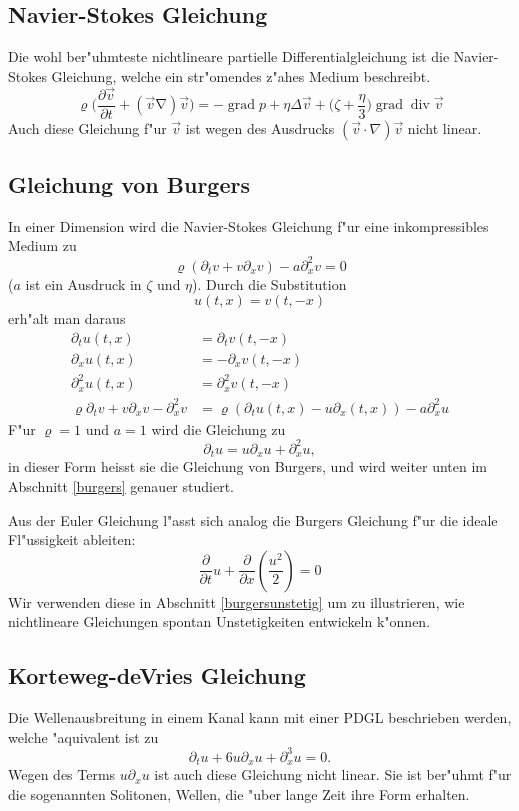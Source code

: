 \subsection{Navier-Stokes Gleichung}
Die wohl ber"uhmteste nichtlineare partielle Differentialgleichung ist
die Navier-Stokes Gleichung, welche ein str"omendes z"ahes Medium beschreibt.
$$\varrho\biggl(
\frac{\partial \vec v}{\partial t}+(\vec v\operatorname \nabla)\vec v
\biggr)
=
-\operatorname{grad}p
+\eta\Delta \vec v+\biggl(\zeta+\frac{\eta}3\biggr)\operatorname{grad}\operatorname{div}\vec v
$$
Auch diese Gleichung f"ur $\vec v$ ist wegen des Ausdrucks $(\vec v\cdot\nabla)\vec v$
nicht linear.

\subsection{Gleichung von Burgers}
In einer Dimension  wird die Navier-Stokes Gleichung f"ur eine inkompressibles
Medium zu
$$\varrho(\partial_t v+v\partial_x v)-a\partial_x^2v=0$$
($a$ ist ein Ausdruck in $\zeta$ und $\eta$).
Durch die Substitution
$$u(t,x)=v(t,-x)$$
erh"alt man daraus 
\begin{align*}
\partial_tu(t,x)&=\partial_tv(t,-x)\\
\partial_xu(t,x)&=-\partial_xv(t,-x)\\
\partial_x^2u(t,x)&=\partial_x^2v(t,-x)\\
\varrho
\partial_t v+v\partial_x v-\partial_x^2v
&=
\varrho(\partial_tu(t,x)-u\partial_x(t,x))-a\partial_x^2u
\end{align*}
F"ur $\varrho=1$ und $a=1$ wird die Gleichung zu
$$\partial_tu=u\partial_xu+\partial_x^2u,$$
in dieser Form heisst sie die Gleichung von Burgers,
und wird weiter unten im Abschnitt
\ref{burgers} genauer studiert.

Aus der Euler Gleichung l"asst sich analog die Burgers Gleichung
f"ur die ideale Fl"ussigkeit ableiten:
$$
\frac{\partial}{\partial t}u+\frac{\partial}{\partial x}\left(\frac{u^2}2\right)
=0
$$
Wir verwenden diese in Abschnitt \ref{burgersunstetig} um zu illustrieren,
wie nichtlineare Gleichungen spontan Unstetigkeiten entwickeln k"onnen.

\subsection{Korteweg-deVries Gleichung}
Die Wellenausbreitung in einem Kanal kann mit einer PDGL beschrieben werden,
welche "aquivalent ist zu
$$\partial_tu+6u\partial_xu+\partial_x^3u=0.$$
Wegen des Terms $u\partial_xu$ ist auch diese Gleichung nicht linear.
Sie ist ber"uhmt f"ur die sogenannten Solitonen, Wellen, die "uber
lange Zeit ihre Form erhalten.

